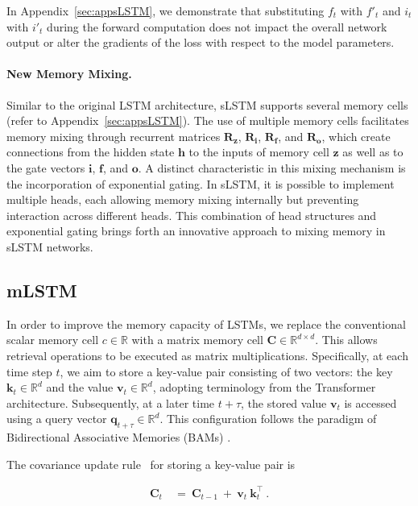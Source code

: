 In Appendix~\ref{sec:appsLSTM}, we demonstrate that substituting $f_t$ with $f'_t$ and $i_t$ with $i'_t$ during the forward computation does not impact the overall network output or alter the gradients of the loss with respect to the model parameters.

\paragraph{New Memory Mixing.} Similar to the original LSTM architecture, sLSTM supports several memory cells (refer to Appendix~\ref{sec:appsLSTM}). The use of multiple memory cells facilitates memory mixing through recurrent matrices $\mathbf{R}_{\mathbf{z}}$, $\mathbf{R}_{\mathbf{i}}$, $\mathbf{R}_{\mathbf{f}}$, and $\mathbf{R}_{\mathbf{o}}$, which create connections from the hidden state $\mathbf{h}$ to the inputs of memory cell $\mathbf{z}$ as well as to the gate vectors $\mathbf{i}$, $\mathbf{f}$, and $\mathbf{o}$. A distinct characteristic in this mixing mechanism is the incorporation of exponential gating. In sLSTM, it is possible to implement multiple heads, each allowing memory mixing internally but preventing interaction across different heads. This combination of head structures and exponential gating brings forth an innovative approach to mixing memory in sLSTM networks.

\subsection{mLSTM}
\label{sec:mLSTM}

In order to improve the memory capacity of LSTMs, we replace the conventional scalar memory cell $c \in \mathbb{R}$ with a matrix memory cell $\mathbf{C} \in \mathbb{R}^{d \times d}$. This allows retrieval operations to be executed as matrix multiplications. Specifically, at each time step $t$, we aim to store a key-value pair consisting of two vectors: the key $\mathbf{k}_t \in \mathbb{R}^d$ and the value $\mathbf{v}_t \in \mathbb{R}^d$, adopting terminology from the Transformer architecture. Subsequently, at a later time $t + \tau$, the stored value $\mathbf{v}_t$ is accessed using a query vector $\mathbf{q}_{t+\tau} \in \mathbb{R}^d$. This configuration follows the paradigm of Bidirectional Associative Memories (BAMs) \citep{Kohonen:72,Anderson:72,Nakano:72,Anderson:77}.

The covariance update rule~\citep{Sejnowski:77,Dayan:91} for storing a key-value pair is

\begin{align}
\mathbf{C}_t \ &= \ \mathbf{C}_{t-1} \ + \ \mathbf{v}_{t} \ \mathbf{k}_t^\top \ .
\end{align}

